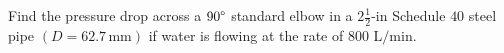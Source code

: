 \documentclass[9pt,xcolor={svgnames, x11names},professionalfonts, mathserif]{beamer}
\begin{document}

      \begin{frame}
				\centering
       \begin{myexam}[width=0.8\textwidth]{}{}
				 \raggedright
        Find the pressure drop across a $90\degree$ standard elbow in a $2\tfrac{1}{2}\text{-in}$ Schedule $40$ steel pipe $(D=62.7\,\text{mm})$ if water is flowing
        at the rate of $800\text{ L/min}$.
			\end{myexam}

      \end{frame}






\end{document}
